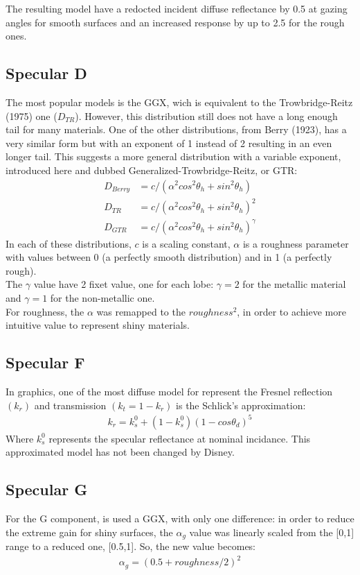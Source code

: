 \documentclass[11pt]{article}
\begin{document}
The resulting model have a redocted incident diffuse reflectance by 0.5 at gazing angles for smooth surfaces and an increased response by up to 2.5 for the rough ones.
\subsection{Specular D}
The most popular models is the GGX, wich is equivalent to the Trowbridge-Reitz (1975) one ($D_{TR}$). 
However, this distribution still does not have a long enough tail for many materials.
One of the other distributions, from Berry (1923), has a very similar
form but with an exponent of 1 instead of 2 resulting in an even longer tail. This suggests a more general
distribution with a variable exponent, introduced here and dubbed Generalized-Trowbridge-Reitz, or
GTR:
\begin{align*}
  D_{Berry} &= c/(\alpha^2 cos^2\theta_h + sin^2\theta_h) \\
  D_{TR} &= c/(\alpha^2 cos^2\theta_h + sin^2\theta_h)^2 \\
  D_{GTR} &= c/(\alpha^2 cos^2\theta_h + sin^2\theta_h)^\gamma
\end{align*}
 In each of these distributions, $\textit{c}$ is a scaling constant, $\alpha$ is a roughness parameter with values between 0 (a perfectly smooth distribution) and in 1 (a perfectly rough).\\
The $\gamma$ value have 2 fixet value, one for each lobe: $\gamma = 2$ for the metallic material and $\gamma = 1$ for the non-metallic one.\\
For roughness, the $\alpha$ was remapped to the $roughness^2$, in order to achieve more intuitive value to represent shiny materials.

\subsection{Specular F}
In graphics, one of the most diffuse model for represent the Fresnel reflection $ (k_r) $ and transmission $ (k_t = 1 - k_r) $ is the Schlick's approximation:
\begin{align*}
	k_r = k_s^0 + (1 - k_s^0)(1 - cos\theta_d)^5
\end{align*}
Where $k_s^0$ represents the specular reflectance at nominal incidance.
This approximated model has not been changed by Disney.
\subsection{Specular G}
For the G component, is used a GGX, with only one difference: in order to reduce the
extreme gain for shiny surfaces, the $\alpha_g$ value was linearly scaled from the [0,1] range to a reduced one, [0.5,1].
So, the new value becomes:
\begin{align*}
	\alpha_g = (0.5 + roughness/2)^2
\end{align*}
\end{document}

